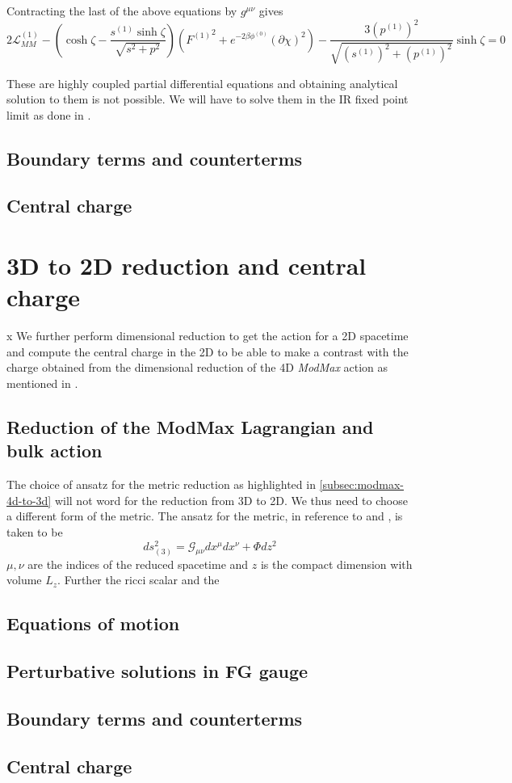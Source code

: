Contracting the last of the above equations by $g^{\mu\nu}$ gives 
\begin{equation}
    2\mathcal{L}^{(1)}_{MM} - \left ( \cosh \zeta - \frac{s^{(1)}\sinh\zeta}{\sqrt{s^2+p^2} } \right ) \left ( {F^{(1)}}^2 + e^{-2\beta\phi^{(0)}}(\partial\chi)^2 \right ) - \frac{3(p^{(1)})^2}{\sqrt{(s^{(1)})^2+(p^{(1)})^2}}\sinh\zeta = 0 \nonumber
\end{equation}

These are highly coupled partial differential equations and obtaining analytical solution to them is not possible. We will have to solve them in the IR fixed point limit as done in \cite{rathi2023ads2}.

\subsection{Boundary terms and counterterms}


\subsection{Central charge}




\section{3D to 2D reduction and central charge}
                                                    x
We further perform dimensional reduction to get the action for a 2D spacetime and compute the central charge in the 2D to be able to make a contrast with the charge obtained from the dimensional reduction of the 4D \textit{ModMax} action as mentioned in \cite{rathi2023ads2}. 

\subsection{Reduction of the ModMax Lagrangian and bulk action}
The choice of ansatz for the metric reduction as highlighted in \ref{subsec:modmax-4d-to-3d} will not word for the reduction from 3D to 2D. We thus need to choose a different form of the metric. The ansatz for the metric, in reference to \cite{Dharewa2024} and \cite{rathi2023ads2}, is taken to be 
\begin{equation}
    ds_{(3)}^2 = \mathcal{G}_{\mu\nu}dx^\mu dx^\nu + \Phi dz^2
\end{equation}
$\mu,\nu$ are the indices of the reduced spacetime and $z$ is the compact dimension with volume $L_z$. Further the ricci scalar and the 

\subsection{Equations of motion}


\subsection{Perturbative solutions in FG gauge}

\subsection{Boundary terms and counterterms}


\subsection{Central charge}


